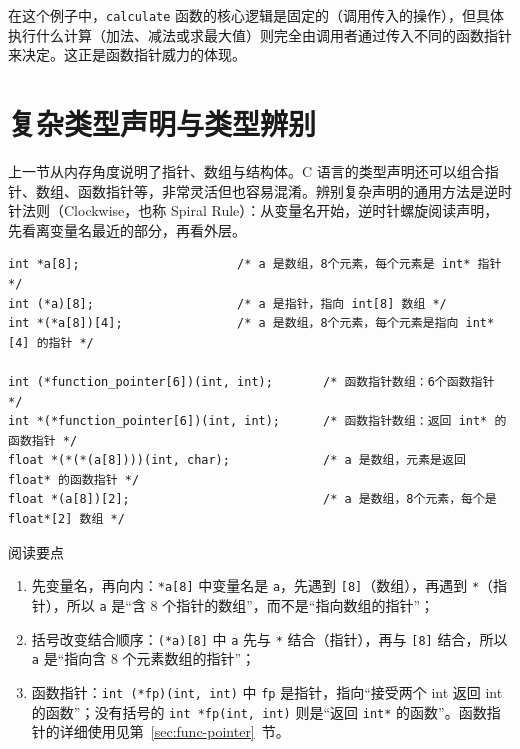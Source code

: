 在这个例子中，\texttt{calculate} 函数的核心逻辑是固定的（调用传入的操作），但具体执行什么计算（加法、减法或求最大值）则完全由调用者通过传入不同的函数指针来决定。这正是函数指针威力的体现。
\section{复杂类型声明与类型辨别}

上一节从内存角度说明了指针、数组与结构体。C 语言的类型声明还可以组合指针、数组、函数指针等，非常灵活但也容易混淆。辨别复杂声明的通用方法是逆时针法则（Clockwise，也称 Spiral Rule）：从变量名开始，逆时针螺旋阅读声明，先看离变量名最近的部分，再看外层。

\begin{lstlisting}[style=c]
int *a[8];                      /* a 是数组，8个元素，每个元素是 int* 指针 */
int (*a)[8];                    /* a 是指针，指向 int[8] 数组 */
int *(*a[8])[4];                /* a 是数组，8个元素，每个元素是指向 int*[4] 的指针 */

int (*function_pointer[6])(int, int);       /* 函数指针数组：6个函数指针 */
int *(*function_pointer[6])(int, int);      /* 函数指针数组：返回 int* 的函数指针 */
float *(*(*(a[8])))(int, char);             /* a 是数组，元素是返回 float* 的函数指针 */
float *(a[8])[2];                           /* a 是数组，8个元素，每个是 float*[2] 数组 */
\end{lstlisting}

\begin{anybox}{阅读要点}
\begin{enumerate}
\item 先变量名，再向内：\texttt{*a[8]} 中变量名是 \texttt{a}，先遇到 \texttt{[8]}（数组），再遇到 \texttt{*}（指针），所以 \texttt{a} 是“含 8 个指针的数组”，而不是“指向数组的指针”；
\item 括号改变结合顺序：\texttt{(*a)[8]} 中 \texttt{a} 先与 \texttt{*} 结合（指针），再与 \texttt{[8]} 结合，所以 \texttt{a} 是“指向含 8 个元素数组的指针”；
\item 函数指针：\texttt{int (*fp)(int, int)} 中 \texttt{fp} 是指针，指向“接受两个 int 返回 int 的函数”；没有括号的 \texttt{int *fp(int, int)} 则是“返回 \texttt{int*} 的函数”。函数指针的详细使用见第~\ref{sec:func-pointer}~节。
\end{enumerate}
\end{anybox}

